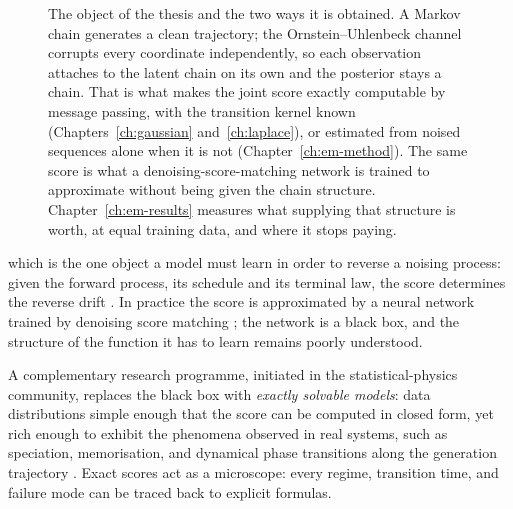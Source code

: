 \begin{figure}[t]
\caption[What this thesis computes, and the comparison it makes]{The object of
the thesis and the two ways it is obtained. A Markov chain generates a clean
trajectory; the Ornstein--Uhlenbeck channel corrupts every coordinate
independently, so each observation attaches to the latent chain on its own and
the posterior stays a chain. That is what makes the joint score exactly
computable by message passing, with the transition kernel known
(Chapters~\ref{ch:gaussian} and~\ref{ch:laplace}), or estimated from noised
sequences alone when it is not (Chapter~\ref{ch:em-method}). The same score is
what a denoising-score-matching network is trained to approximate without being
given the chain structure. Chapter~\ref{ch:em-results} measures what supplying
that structure is worth, at equal training data, and where it stops paying.}
\label{fig:thesis-pipeline}
\end{figure}

which is the one object a model must learn in order to reverse a noising
process: given the forward process, its schedule and its terminal law, the score
determines the reverse drift \citep{anderson1982reverse}. In
practice the score is approximated by a neural network trained by
denoising score matching \citep{hyvarinen2005estimation,
vincent2011connection}; the network is a black box, and the structure of
the function it has to learn remains poorly understood.

A complementary research programme, initiated in the statistical-physics
community, replaces the black box with \emph{exactly solvable models}:
data distributions simple enough that the score can be computed in
closed form, yet rich enough to exhibit the phenomena observed in real
systems, such as speciation, memorisation, and dynamical phase
transitions along the generation trajectory \citep{biroli2023generative,
biroli2024dynamical, raya2023spontaneous, ghio2024sampling,
achilli2026speciation}. Exact scores act as a microscope: every regime,
transition time, and failure mode can be traced back to explicit
formulas.

